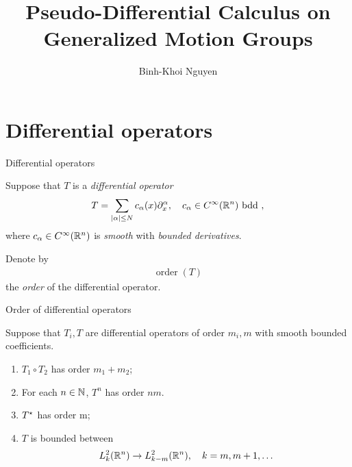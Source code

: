 \documentclass{beamer}
\title{Pseudo-Differential Calculus on Generalized Motion Groups}
\author{Binh-Khoi Nguyen}
\DeclareMathOperator{\order}{order}
\begin{document}
\maketitle

\section{Differential operators}

\renewcommand \Group {\R^n}

\begin{frame}
    {Differential operators}

    Suppose that $T$ is a \emph{differential operator}
    \begin{align*}
        T =
        \sum_{\abs \alpha \leq N}
        c_\alpha(x)
        \iD {x^\alpha},
        \quad
        c_\alpha \in \SmoothFunctions {\R^n}
        \text{ bdd },
    \end{align*}
    where $c_\alpha \in {C^\infty(\mathbb{R}^n)}$ is \emph{smooth} with \emph{bounded derivatives}.

    \pause

    Denote by
    \begin{align*}
        \order(T)
    \end{align*}
    the \emph{order} of the differential operator.
\end{frame}

\begin{frame}
    {Order of differential operators}

    Suppose that $T_i, T$ are differential operators
    of order $m_i, m$
    with smooth bounded coefficients.

    \begin{enumerate}
        \item $T_1 \circ T_2$ has order $m_1 + m_2$;
            \pause
        \item For each $n \in \mathbb{N}$, $T^n$ has order $n m$.
            \pause
        \item ${T}^\star$ has order m;
            \pause
        \item $T$ is bounded between
            \begin{align*}
                \Sobolev k \to \Sobolev {k - m},
                \quad k = m, m + 1, \dots
            \end{align*}
    \end{enumerate}
\end{frame}
\end{document}
